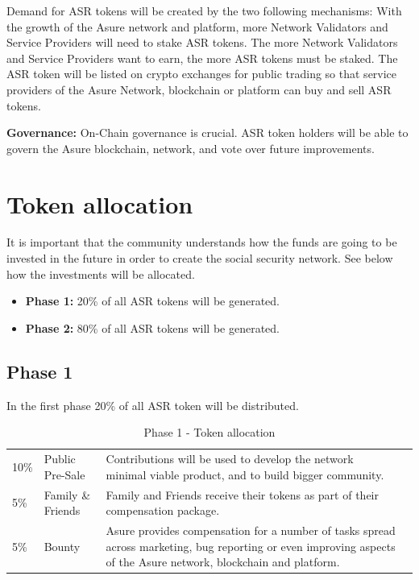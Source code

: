 Demand for ASR tokens will be created by the two following mechanisms: With the growth of the Asure network and platform, more Network Validators and Service Providers will need to stake ASR tokens. The more Network Validators and Service Providers want to earn, the more ASR tokens must be staked.\newline
The ASR token will be listed on crypto exchanges for public trading so that service providers of the Asure Network, blockchain or platform can buy and sell ASR tokens.\newline

\textbf{Governance:}
On-Chain governance is crucial. ASR token holders will be able to govern the Asure blockchain, network, and vote over future improvements.
\newline\newline


\section{Token allocation}

It is important that the community understands how the funds are going to be invested in the future in order to create the social security network. See below how the investments will be allocated.

\begin{itemize}
\item \textbf{Phase 1:} 20\% of all ASR tokens will be generated.
\item \textbf{Phase 2:} 80\% of all ASR tokens will be generated.
\end{itemize}

\subsection{Phase 1}

In the first phase 20\% of all ASR token will be distributed.

\begin{table}[H]
\begin{tabular}{llp{}l}
  10\% & Public Pre-Sale & Contributions will be used to develop the network minimal viable product, and to build bigger community.\\
  5\% & Family \& Friends & Family and Friends receive their tokens as part of their compensation package.\\
  5\% & Bounty & Asure provides compensation for a number of tasks spread across marketing, bug reporting or even improving aspects of the Asure network, blockchain and platform.
\end{tabular}
\caption{\label{tab:table-name} Phase 1 - Token allocation}
\end{table}

